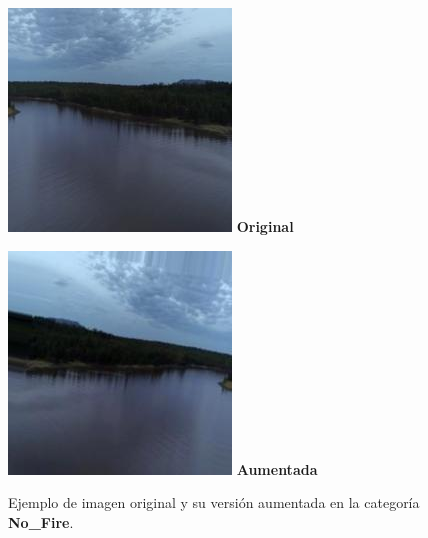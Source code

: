 \begin{figure}[htbp]
    \centering
    \begin{minipage}[b]{0.45\textwidth}
      \centering
      \includegraphics[width=\linewidth]{images/original.jpg}
      \vspace{0.5em}
      \small\textbf{Original}
    \end{minipage}
    \hfill
    \begin{minipage}[b]{0.45\textwidth}
      \centering
      \includegraphics[width=\linewidth]{images/aumentada.jpg}
      \vspace{0.5em}
      \small\textbf{Aumentada}
    \end{minipage}
    \caption{Ejemplo de imagen original y su versión aumentada en la categoría \textbf{No\_Fire}.}
    \label{fig:original_aumentada}
  \end{figure}


